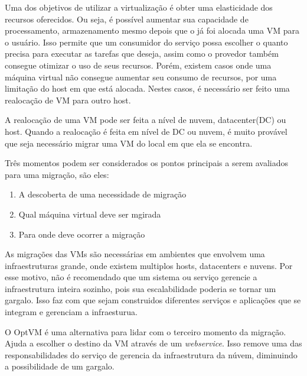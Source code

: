 Uma dos objetivos de utilizar a virtualização é obter uma elasticidade dos recursos oferecidos.
Ou seja, é possível aumentar sua capacidade de processamento, armazenamento mesmo depois que o
já foi alocada uma VM para o usuário.
Isso permite que um consumidor do  serviço possa escolher o quanto precisa para executar as 
tarefas que deseja, assim como o provedor também consegue otimizar o uso de seus recursos. Porém,
existem casos onde uma máquina virtual não consegue aumentar seu consumo de recursos, por uma limitação
do host em que está alocada. Nestes casos, é necessário ser feito uma realocação de VM para outro 
host.

A realocação de uma VM pode ser feita a nível de nuvem, datacenter(DC) ou host.
Quando a realocação é feita em nível de DC ou nuvem, é muito provável que seja 
necessário migrar uma VM do local em que ela se encontra. 

Três momentos podem ser considerados os pontos principais a serem avaliados para uma migração, 
são eles:

\begin{enumerate}
\item A descoberta de uma necessidade de migração
\item Qual máquina virtual deve ser mgirada
\item Para onde deve ocorrer a migração
\end{enumerate}

As migrações das VMs são necessárias em ambientes que envolvem uma infraestruturas
grande, onde existem multiplos hosts, datacenters e nuvens. Por esse motivo, não é recomendado que 
um sistema ou serviço gerencie a infraestrutura inteira sozinho, pois sua escalabilidade 
poderia se tornar um gargalo. Isso faz com que sejam construidos diferentes serviços e aplicações 
que se integram e gerenciam a infraesturua.

O OptVM é uma alternativa para lidar com o terceiro momento da migração. 
Ajuda a escolher o destino da VM através de um \textit{webservice}. Isso 
remove uma das responsabilidades do serviço de gerencia da infraestrutura da
núvem, diminuindo a possibilidade de um gargalo.

